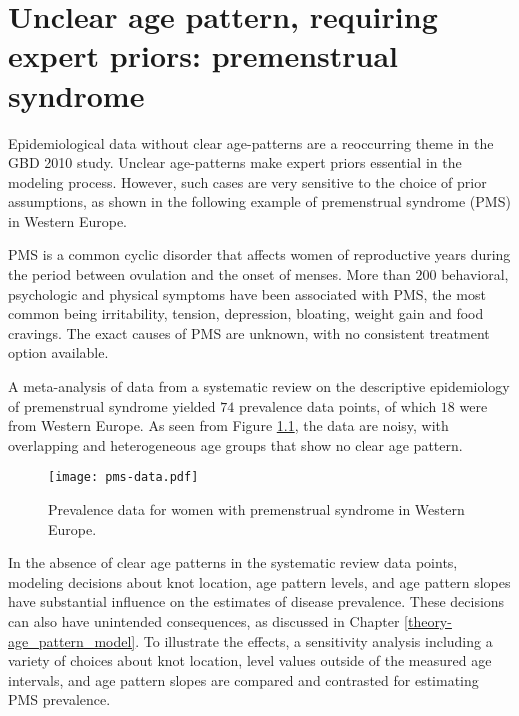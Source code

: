 \chapter{Unclear age pattern, requiring expert priors: premenstrual syndrome}
\label{applications-priors_knots_select}

Epidemiological data without clear age-patterns are a reoccurring
theme in the GBD 2010 study.  Unclear age-patterns make expert priors
essential in the modeling process.  However, such cases are very
sensitive to the choice of prior assumptions, as shown in the
following example of premenstrual syndrome (PMS) in Western Europe.

PMS is a common cyclic disorder that affects women of reproductive
years during the period between ovulation and the onset of menses.
More than $200$ behavioral, psychologic and physical symptoms have been
associated with PMS, the most common being irritability, tension,
depression, bloating, weight gain and food cravings.  The exact causes
of PMS are unknown, with no consistent
treatment option available. \cite{dickerson_premenstrual_2003, singh_incidence_1998,
  goodale_alleviation_1990}

A meta-analysis of data from a systematic review on the descriptive
epidemiology of premenstrual syndrome yielded $74$ prevalence
data points, of which $18$ were from Western Europe.  As seen from Figure
\ref{fig:app-pms_data}, the data are noisy, with overlapping and
heterogeneous age groups that show no clear age pattern.

    \begin{figure}[h]
        \begin{center}
            \texttt{[image: pms-data.pdf]}
            \caption{Prevalence data for women with premenstrual
              syndrome in Western Europe.}
        \end{center}
        \label{fig:app-pms_data}
    \end{figure}

In the absence of clear age patterns in the systematic review data
points, modeling decisions about knot location, age pattern levels,
and age pattern slopes have substantial influence on the estimates of
disease prevalence.  These decisions can also have unintended
consequences, as discussed in Chapter \ref{theory-age_pattern_model}.
To illustrate the effects, a sensitivity analysis including a variety
of choices about knot location,
level values outside of the measured age intervals, and age pattern
slopes are compared and contrasted for estimating PMS prevalence.

